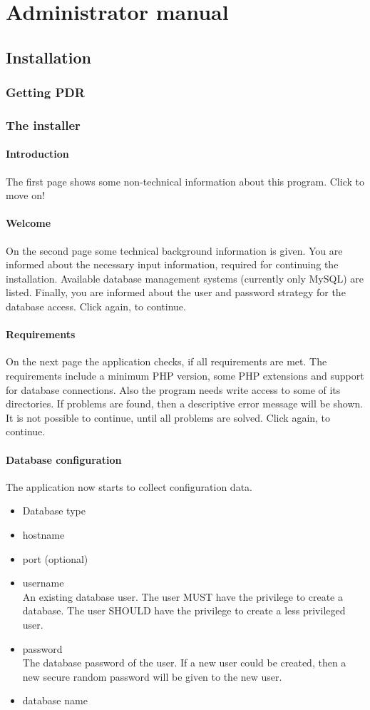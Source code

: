 \chapter{Administrator manual}
\section{Installation}\label{sec:installation}
\subsection{Getting PDR}
\subsection{The installer}
\subsubsection{Introduction}
The first page shows some non-technical information about this program. Click  to move on!
\subsubsection{Welcome}
On the second page some technical background information is given. You are informed about the necessary input information, required for continuing the installation. Available database management systems (currently only MySQL) are listed. Finally, you are informed about the user and password strategy for the database access. Click  again, to continue.
\subsubsection{Requirements}
On the next page the application checks, if all requirements are met. The requirements include a minimum PHP version, some PHP extensions and support for database connections. Also the program needs write access to some of its directories.
If problems are found, then a descriptive error message will be shown. It is not possible to continue, until all problems are solved.
Click  again, to continue.
\subsubsection{Database configuration}
The application now starts to collect configuration data.
\begin{itemize}
\item Database type
\item hostname
\item port (optional)
\item username \\An existing database user. The user MUST have the privilege to create a database. The user SHOULD have the privilege to create a less privileged user.
\item password \\The database password of the user. If a new user could be created, then a new secure random password will be given to the new user.
\item database name
\end{itemize}
